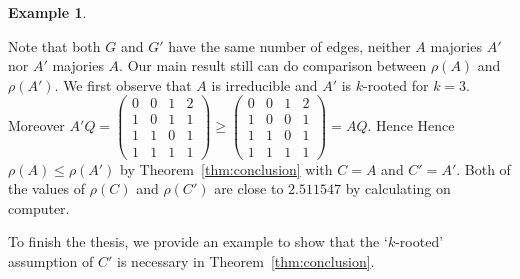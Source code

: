 \documentclass[12pt, a4paper]{article}
\theoremstyle{plain}
\theoremstyle{definition}
\newtheorem{exam}[thm]{Example}
\begin{document}
\begin{exam}
\begin{center}
\end{center}


Note that both $G$ and $G'$ have the same number of edges, 
neither $A$ majories $A'$ nor $A'$ majories $A$. Our main result still can do comparison between 
$\rho(A)$ and $\rho(A')$. 
We first observe that $A$ is irreducible and $A'$ is $k$-rooted for $k=3$. Moreover 
$A'Q=\begin{pmatrix}
    0 & 0 & 1 & 2\\
    1 & 0 & 1 & 1\\
    1 & 1 & 0 & 1\\
    1 & 1 & 1 & 1
    \end{pmatrix}\geq \begin{pmatrix}
    0 & 0 & 1 & 2\\
    1 & 0 & 0 & 1\\
    1 & 1 & 0 & 1\\
    1 & 1 & 1 & 1
    \end{pmatrix}=AQ$. 
Hence Hence $\rho(A)\leq\rho(A')$ by Theorem~\ref{thm:conclusion} with $C=A$ and $C'=A'$. 
Both of the values of $\rho(C)$ and $\rho(C')$ are close to $2.511547$ by  calculating on computer. \cite[sage]{sage}
\end{exam}

To finish the thesis, we provide an example to show that the `$k$-rooted' assumption of $C'$ is necessary in Theorem~\ref{thm:conclusion}. 
\end{document}
